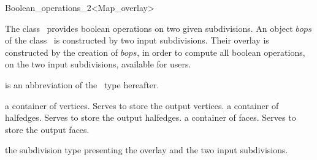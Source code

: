 
\ccRefPageBegin



\begin{ccRefClass}{Boolean_operations_2<Map_overlay>}
\label{OVL_sec:bops}
    
\ccDefinition
The class \ccClassTemplateName\ provides boolean operations 
on two given subdivisions. 
An object $bops$ of the class \ccClassTemplateName\ is constructed by two input 
subdivisions. 
Their overlay is constructed by the creation of $bops$, in order to compute 
all boolean operations, on the two input subdivisions, available for users.

 is an abbreviation of the \ccRefName\ type hereafter.


\ccTypes

  \ccGlue
  {a container of vertices. Serves to store the output vertices.}
  \ccGlue
  {a container of halfedges. Serves to store the output halfedges.}
  \ccGlue
  {a container of faces. Serves to store the output faces.}

  {the subdivision type presenting the overlay and the two input subdivisions.}
  
\ccCreation
    

\end{ccRefClass}

